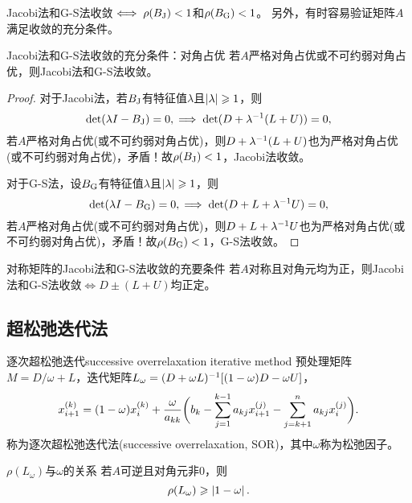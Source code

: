 \begin{remark}
    Jacobi法和G-S法收敛$\iff\rho(B_\text J)<1$和$\rho(B_\text G)<1$。
    另外，有时容易验证矩阵$A$满足收敛的充分条件。
\end{remark}

\begin{theorem}
    {Jacobi法和G-S法收敛的充分条件：对角占优}{}
    若$A$严格对角占优或不可约弱对角占优，则Jacobi法和G-S法收敛。
\end{theorem}

\begin{proof}
    对于Jacobi法，若$B_\text J$有特征值$\lambda$且$\left\lvert\lambda\right\rvert\geqslant 1$，则 
    \[
        \det(\lambda I-B_\text J)=0,\implies\det(D+\lambda^{-1}(L+U))=0,
    \]
    若$A$严格对角占优(或不可约弱对角占优)，则$D+\lambda^{-1}(L+U)$也为严格对角占优(或不可约弱对角占优)，矛盾！故$\rho(B_\text J)<1$，Jacobi法收敛。

    对于G-S法，设$B_\text G$有特征值$\lambda$且$\left\lvert\lambda\right\rvert\geqslant 1$，则 
    \[
        \det(\lambda I-B_\text G)=0,\implies\det(D+L+\lambda^{-1} U)=0,
    \]
    若$A$严格对角占优(或不可约弱对角占优)，则$D+L+\lambda^{-1} U$也为严格对角占优(或不可约弱对角占优)，矛盾！故$\rho(B_\text G)<1$，G-S法收敛。
\end{proof}

\begin{theorem}
    {对称矩阵的Jacobi法和G-S法收敛的充要条件}{}
    若$A$对称且对角元均为正，则Jacobi法和G-S法收敛$\iff D\pm(L+U)$均正定。
\end{theorem}

\subsection{超松弛迭代法}

\begin{example}
    {逐次超松弛迭代}{successive overrelaxation iterative method}
    预处理矩阵$M=D/\omega+L$，迭代矩阵$L_\omega=(D+\omega L)^{-1}[(1-\omega)D-\omega U]$，
    \begin{equation}
        x_{i+1}^{(k)}=(1-\omega)x_i^{(k)}+\frac\omega{a_{kk}}\biggl(b_k-\sum_{j=1}^{k-1}a_{kj}x_{i+1}^{(j)}-\sum_{j=k+1}^na_{kj}x_i^{(j)}\biggr).
    \end{equation}
    称为逐次超松弛迭代法(successive overrelaxation, SOR)，其中$\omega$称为松弛因子。
\end{example}

\begin{theorem}
    {$\rho(L_\omega)$与$\omega$的关系}{}
    若$A$可逆且对角元非0，则
    \begin{equation}
        \rho(L_\omega)\geqslant\left\lvert1-\omega\right\rvert.
    \end{equation}
\end{theorem}

